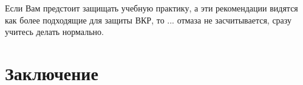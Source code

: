 \noindent Если Вам предстоит защищать учебную практику, а эти рекомендации видятся как более подходящие для защиты ВКР, то ... отмаза не засчиты\-вается, сразу учитесь делать нормально.
\section*{Заключение}


\setmonofont[Mapping=tex-text]{CMU Typewriter Text}
  
  

